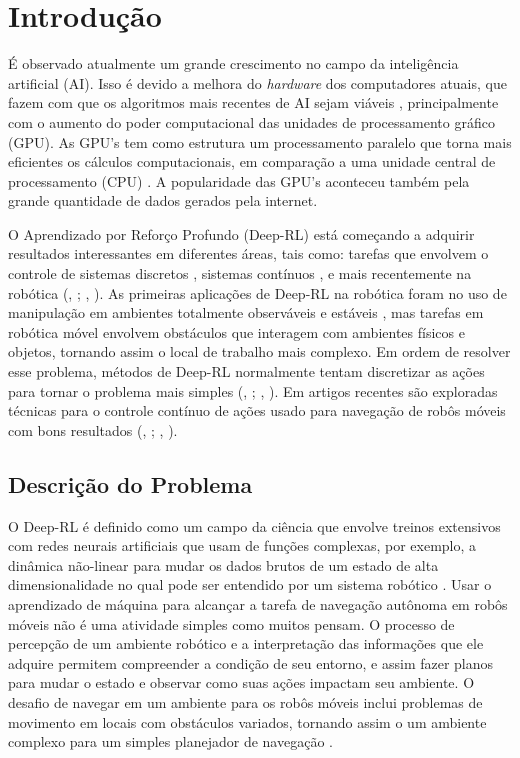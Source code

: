 \chapter{Introdução}

É observado atualmente um grande crescimento no campo da inteligência artificial (AI). 
Isso é devido a melhora do \textit{hardware} dos computadores atuais, que fazem com que os algoritmos mais recentes de AI sejam viáveis \cite{luo2005artificial}, principalmente com o aumento do poder computacional das unidades de processamento gráfico (GPU). 
As GPU’s tem como estrutura um processamento paralelo que torna mais eficientes os cálculos computacionais, em comparação a uma unidade central de processamento (CPU) \cite{asano2009performance}. 
A popularidade das GPU’s aconteceu também pela grande quantidade de dados gerados pela internet.

O Aprendizado por Reforço Profundo (Deep-RL) está começando a adquirir resultados interessantes em diferentes áreas, tais como: tarefas que envolvem o controle de sistemas discretos \cite{mnih2013playing}, sistemas contínuos \cite{lillicrap2015continuous}, e mais recentemente na robótica (\citeauthor{gu2017deep}, \citeyear{gu2017deep}; \citeauthor{mahmood2018benchmarking}, \citeyear{mahmood2018benchmarking}).
As primeiras aplicações de Deep-RL na robótica foram no uso de manipulação em ambientes totalmente observáveis e estáveis \cite{gu2016continuous}, mas tarefas em robótica móvel envolvem obstáculos que interagem com ambientes físicos e objetos, tornando assim o local de trabalho mais complexo.
Em ordem de resolver esse problema, métodos de Deep-RL normalmente tentam discretizar as ações para tornar o problema mais simples (\citeauthor{tai2016towards}, \citeyear{tai2016towards}; \citeauthor{zhu2017target}, \citeyear{zhu2017target}).
Em artigos recentes são exploradas técnicas para o controle contínuo de ações usado para navegação de robôs móveis com bons resultados (\citeauthor{tai2017virtual}, \citeyear{tai2017virtual}; \citeauthor{chen2017socially}, \citeyear{chen2017socially}).

\section{Descrição do Problema}

O Deep-RL é definido como um campo da ciência que envolve treinos extensivos com redes neurais artificiais que usam de funções complexas, por exemplo, a dinâmica não-linear para mudar os dados brutos de um estado de alta dimensionalidade no qual pode ser entendido por um sistema robótico \cite{lecun2015deep}.
Usar o aprendizado de máquina para alcançar a tarefa de navegação autônoma em robôs móveis não é uma atividade simples como muitos pensam. 
O processo de percepção de um ambiente robótico e a interpretação das informações que ele adquire permitem compreender a condição de seu entorno, e assim fazer planos para mudar o estado e observar como suas ações impactam seu ambiente.
O desafio de navegar em um ambiente para os robôs móveis inclui problemas de movimento em locais com obstáculos variados, tornando assim o um ambiente complexo para um simples planejador de navegação \cite{shabbir2018survey}.

